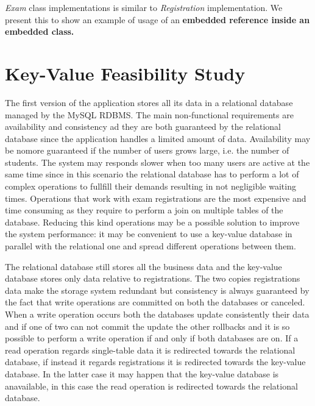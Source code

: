 \documentclass{report}
\begin{document}
\textit{Exam} class implementations is similar to \textit{Registration} implementation. We present this to show an example of usage of an \textbf{embedded reference inside an embedded class.}



\chapter*{Key-Value Feasibility Study}
The first version of the application stores all its data in a relational database managed by the MySQL RDBMS.
The main non-functional requirements are availability and consistency ad they are both guaranteed by the relational database since the application handles a limited amount of data.
Availability may be nomore guaranteed if the number of users grows large, i.e. the number of students. The system may responds slower when too many users are active at the same time since in this scenario the relational database has to perform a lot of complex operations to fullfill their demands resulting in not negligible waiting times. \linebreak
Operations that work with exam registrations are the most expensive and time consuming as they require to perform a join on multiple tables of the database. Reducing this kind operations may be a possible solution to improve the system performance: it may be convenient to use a key-value database in parallel with the relational one and spread different operations between them. \linebreak

The relational database still stores all the business data and the key-value database stores only data relative to registrations. The two copies registrations data make the storage system redundant but consistency is always guaranteed by the fact that write operations are committed on both the databases or canceled.
When a write operation occurs both the databases update consistently their data and if one of two can not commit the update the other rollbacks and it is so possible to perform a write operation if and only if both databases are on.
If a read operation regards single-table data it is redirected towards the relational database, if instead it regards registrations it is redirected towards the key-value database. In the latter case it may happen that the key-value database is anavailable, in this case the read operation is redirected towards the relational database. \linebreak 
\end{document}
